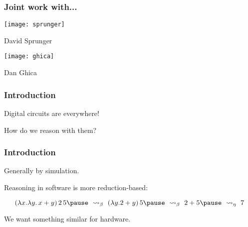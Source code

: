 \begin{frame}
    \frametitle{Joint work with...}

    \begin{minipage}{0.49\textwidth}
        \centering
        \texttt{[image: sprunger]}
        
        David Sprunger
    \end{minipage}
    \begin{minipage}{0.49\textwidth}
        \centering
        \texttt{[image: ghica]}
        
        Dan Ghica
    \end{minipage}

\end{frame}

\begin{frame}
    \frametitle{Introduction}
    
    Digital circuits are everywhere!

    \pause

    How do we reason with them?

\end{frame}

\begin{frame}
    \frametitle{Introduction}

    Generally by \alert{simulation}.

    \pause

    Reasoning in \alert{software} is more \alert{reduction-based}:

    \[
        (\lambda x.\lambda y.\, x + y) \, 2 \, 5 
        \pause\
        \rightsquigarrow_{\beta}
        \
        (\lambda y. 2 + y) \, 5 
        \pause\
        \rightsquigarrow_{\beta}
        \
        2 + 5 
        \pause\
        \rightsquigarrow_{\eta}
        \
        7
    \]

    We want something similar for hardware.
\end{frame}

\begin{frame}
    \frametitle{}

    

\end{frame}